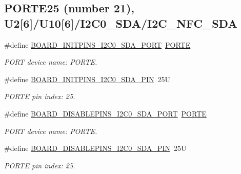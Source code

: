 \subsection*{P\+O\+R\+T\+E25 (number 21), U2\mbox{[}6\mbox{]}/\+U10\mbox{[}6\mbox{]}/\+I2\+C0\+\_\+\+S\+D\+A/\+I2\+C\+\_\+\+N\+F\+C\+\_\+\+S\+DA}
\begin{DoxyCompactItemize}
\item 
\mbox{\label{group__pin__mux_ga1e9219cb6946ab510aa7ab03f4609ed7}} 
\#define \mbox{\hyperlink{group__pin__mux_ga1e9219cb6946ab510aa7ab03f4609ed7}{B\+O\+A\+R\+D\+\_\+\+I\+N\+I\+T\+P\+I\+N\+S\+\_\+\+I2\+C0\+\_\+\+S\+D\+A\+\_\+\+P\+O\+RT}}~\mbox{\hyperlink{group___p_o_r_t___peripheral___access___layer_ga7e2386d3b1084b5b875ae3696f550ba9}{P\+O\+R\+TE}}
\begin{DoxyCompactList}\small\item\em P\+O\+RT device name\+: P\+O\+R\+TE. \end{DoxyCompactList}\item 
\mbox{\label{group__pin__mux_gaa41457e625eaafd348afe487b87e7a94}} 
\#define \mbox{\hyperlink{group__pin__mux_gaa41457e625eaafd348afe487b87e7a94}{B\+O\+A\+R\+D\+\_\+\+I\+N\+I\+T\+P\+I\+N\+S\+\_\+\+I2\+C0\+\_\+\+S\+D\+A\+\_\+\+P\+IN}}~25U
\begin{DoxyCompactList}\small\item\em P\+O\+R\+TE pin index\+: 25. \end{DoxyCompactList}\item 
\mbox{\label{group__pin__mux_ga218770893e626490e9438def7d179495}} 
\#define \mbox{\hyperlink{group__pin__mux_ga218770893e626490e9438def7d179495}{B\+O\+A\+R\+D\+\_\+\+D\+I\+S\+A\+B\+L\+E\+P\+I\+N\+S\+\_\+\+I2\+C0\+\_\+\+S\+D\+A\+\_\+\+P\+O\+RT}}~\mbox{\hyperlink{group___p_o_r_t___peripheral___access___layer_ga7e2386d3b1084b5b875ae3696f550ba9}{P\+O\+R\+TE}}
\begin{DoxyCompactList}\small\item\em P\+O\+RT device name\+: P\+O\+R\+TE. \end{DoxyCompactList}\item 
\mbox{\label{group__pin__mux_ga11e31956f253b3036e3976955be7ba38}} 
\#define \mbox{\hyperlink{group__pin__mux_ga11e31956f253b3036e3976955be7ba38}{B\+O\+A\+R\+D\+\_\+\+D\+I\+S\+A\+B\+L\+E\+P\+I\+N\+S\+\_\+\+I2\+C0\+\_\+\+S\+D\+A\+\_\+\+P\+IN}}~25U
\begin{DoxyCompactList}\small\item\em P\+O\+R\+TE pin index\+: 25. \end{DoxyCompactList}\end{DoxyCompactItemize}
